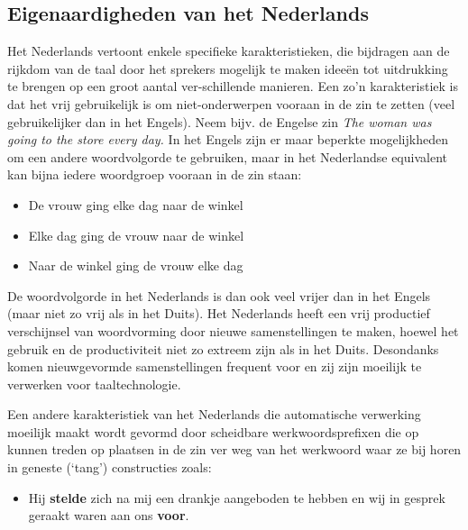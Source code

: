 \documentclass[]{../../metanetpaper}
\begin{document}
\begin{multicols}{2}
\subsection{Eigenaardigheden van het Nederlands}

Het Nederlands vertoont enkele specifieke karakteristieken, die bijdragen aan de rijkdom van de taal door het sprekers mogelijk te maken idee{\"e}n tot uitdrukking te brengen op een groot aantal ver-schillende manieren. Een zo'n karakteristiek is dat het vrij gebruikelijk is om niet-onderwerpen vooraan in de zin te zetten (veel gebruikelijker dan in het Engels). Neem bijv. de Engelse zin \textit{The woman was going to the store every day.} In het Engels zijn er maar beperkte mogelijkheden om een andere woordvolgorde te gebruiken, maar in het Nederlandse equivalent kan bijna iedere woordgroep vooraan in de zin staan:


\begin{itemize}
\item De vrouw ging elke dag naar de winkel
\item    Elke dag ging de vrouw naar de winkel
\item    Naar de winkel ging de vrouw elke dag
\end{itemize}

  

    De woordvolgorde in het Nederlands is dan ook veel vrijer dan in het Engels (maar niet zo vrij als in het Duits).
    Het Nederlands heeft een vrij productief verschijnsel van woordvorming door nieuwe samenstellingen te maken, hoewel het gebruik en de productiviteit niet zo extreem zijn als in het Duits. Desondanks komen nieuwgevormde samenstellingen frequent voor en zij zijn moeilijk te verwerken voor taaltechnologie.

    Een andere karakteristiek van het Nederlands die automatische verwerking moeilijk maakt wordt gevormd door scheidbare werkwoordsprefixen die op kunnen treden op plaatsen in de zin ver weg van het werkwoord waar ze bij horen in geneste (`tang') constructies zoals:

\begin{itemize}
\item Hij \textbf{stelde} zich na mij een drankje aangeboden te hebben en wij in gesprek geraakt waren aan ons \textbf{voor}.
\end{itemize}


\end{multicols}
\end{document}
